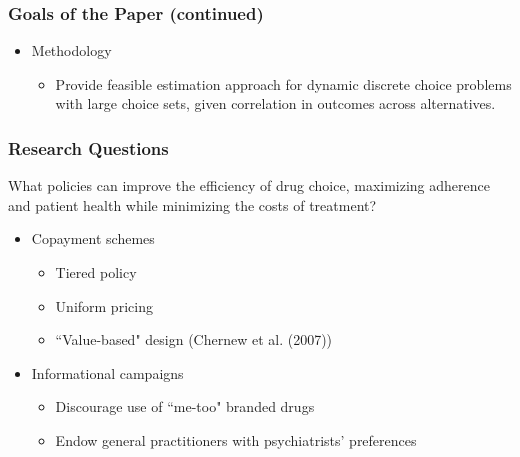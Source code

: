 \documentclass[xcolor=pdftex,dvipsnames,table,mathserif,aspectratio=169]{beamer}
\begin{document}

\begin{frame}
\frametitle{Goals of the Paper (continued)}

\begin{itemize}
\item Methodology

\begin{itemize}
\item Provide feasible estimation approach for dynamic discrete choice
problems with large choice sets, given correlation in outcomes across
alternatives.
\end{itemize}
\end{itemize}
\end{frame}




\begin{frame}
\frametitle{Research Questions}

What policies can improve the efficiency of drug choice, maximizing
adherence and patient health while minimizing the costs of treatment?

\begin{itemize}
\item Copayment schemes

\begin{itemize}
\item Tiered policy

\item Uniform pricing

\item ``Value-based" design (Chernew et al. (2007))
\end{itemize}

\item Informational campaigns

\begin{itemize}
\item Discourage use of ``me-too" branded drugs

\item Endow general practitioners with psychiatrists' preferences
\end{itemize}
\end{itemize}
\end{frame}

\end{document}
